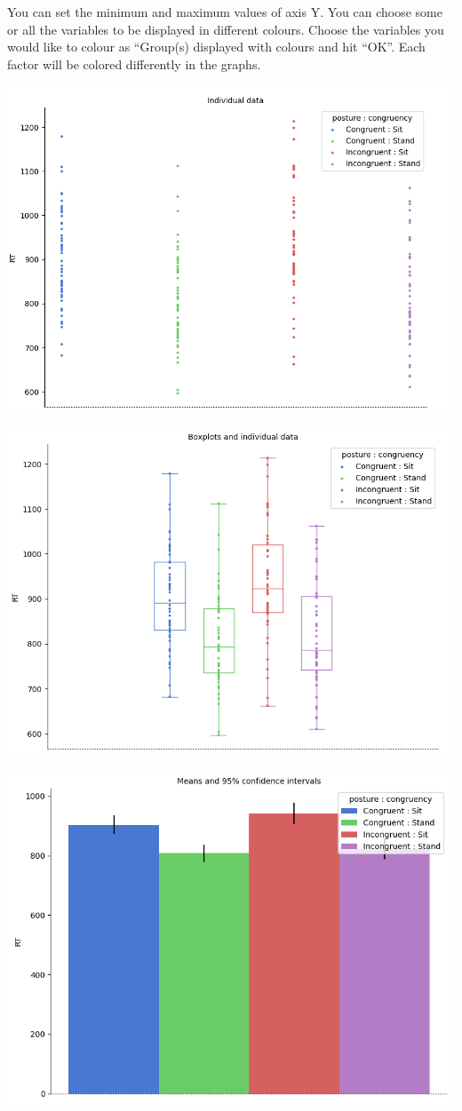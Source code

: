 \documentclass[
]{book}
\begin{document}
You can set the minimum and maximum values of axis Y. You can choose some or all the variables to be displayed in different colours. Choose the variables you would like to colour as ``Group(s) displayed with colours and hit ``OK''. Each factor will be colored differently in the graphs.

\includegraphics{img/ch10/10.4display_plot.png}

\includegraphics{img/ch10/10.4display_boxplot.png}

\includegraphics{img/ch10/10.4display_CIplot.png}
\end{document}
